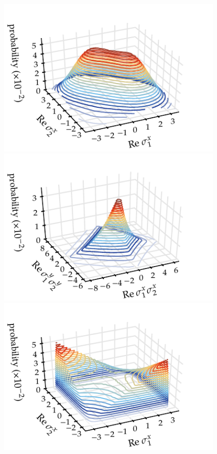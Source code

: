 \begin{figure}
    \includegraphics{figures_generated/bell/distribution_P1.pdf}%
    \includegraphics{figures_generated/bell/distribution_P2.pdf}\\
    \includegraphics{figures_generated/bell/distribution_Q1.pdf}%

\end{figure}
